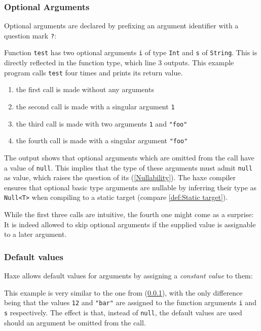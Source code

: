 \documentclass{article}
\newcommand{\type}[1]{\texttt{#1}}
\newcommand{\expr}[1]{\texttt{#1}}
\newcommand{\fullref}[1]{\nameref{#1} (\cref{#1})}
\begin{document}
\subsubsection{Optional Arguments}
\label{Optional Arguments}

Optional arguments are declared by prefixing an argument identifier with a question mark \expr{?}:


Function \expr{test} has two optional arguments \expr{i} of type \type{Int} and \expr{s} of \type{String}. This is directly reflected in the function type, which line 3 outputs. 
This example program calls \expr{test} four times and prints its return value.

\begin{enumerate}
	\item the first call is made without any arguments
	\item the second call is made with a singular argument \expr{1}
	\item the third call is made with two arguments \expr{1} and \expr{"foo"}
	\item the fourth call is made with a singular argument \expr{"foo"}
\end{enumerate}
The output shows that optional arguments which are omitted from the call have a value of \expr{null}. This implies that the type of these arguments must admit \expr{null} as value, which raises the question of its \fullref{Nullability}. The haxe compiler ensures that optional basic type arguments are nullable by inferring their type as \type{Null<T>} when compiling to a static target (compare \cref{def:Static target}).

While the first three calls are intuitive, the fourth one might come as a surprise: It is indeed allowed to skip optional arguments if the supplied value is assignable to a later argument.


\subsubsection{Default values}

Haxe allows default values for arguments by assigning a \emph{constant value} to them:


This example is very similar to the one from \fullref{Optional Arguments}, with the only difference being that the values \expr{12} and \expr{"bar"} are assigned to the function arguments \expr{i} and \expr{s} respectively. The effect is that, instead of \expr{null}, the default values are used should an argument be omitted from the call.
\end{document}
